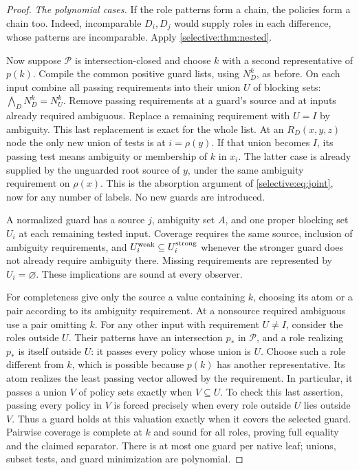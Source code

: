 \begin{proof}
\emph{The polynomial cases.}
If the role patterns form a chain, the policies form a chain too.
Indeed, incomparable $D_i,D_j$ would supply roles in each difference,
whose patterns are incomparable. Apply \cref{selective:thm:nested}.

Now suppose $\mathcal P$ is intersection-closed and choose $k$ with a
second representative of $p(k)$. Compile the common positive guard
lists, using $N_D^k$, as before. On each input combine all passing
requirements into their union $U$ of blocking sets:
$\bigwedge_D N_D^k=N_U^k$. Remove passing requirements at a guard's
source and at inputs already required ambiguous. Replace a remaining
requirement with $U=I$ by ambiguity. This last replacement is exact
for the whole list. At an $R_D(x,y,z)$ node the only new union of
tests is at $i=\rho(y)$. If that union becomes $I$, its passing test
means ambiguity or membership of $k$ in $x_i$. The latter case is
already supplied by the unguarded root source of $y$, under the same
ambiguity requirement on $\rho(x)$. This is the absorption argument
of \eqref{selective:eq:joint}, now for any number of labels. No new
guards are introduced.

A normalized guard has a source $j$, ambiguity set $A$, and one
proper blocking set $U_i$ at each remaining tested input. Coverage
requires the same source, inclusion of ambiguity requirements, and
$U_i^{\rm weak}\subseteq U_i^{\rm strong}$ whenever the stronger
guard does not already require ambiguity there. Missing requirements
are represented by $U_i=\varnothing$. These implications are sound
at every observer.

For completeness give only the source a value containing $k$, choosing
its atom or a pair according to its ambiguity requirement. At a
nonsource required ambiguous use a pair omitting $k$. For any other
input with requirement $U\ne I$, consider the roles outside $U$.
Their patterns have an intersection $p_*$ in $\mathcal P$, and a role
realizing $p_*$ is itself outside $U$: it passes every policy whose
union is $U$. Choose such a role different from $k$, which is possible
because $p(k)$ has another representative. Its atom realizes the
least passing vector allowed by the requirement. In particular, it
passes a union $V$ of policy sets exactly when $V\subseteq U$.
To check this last assertion, passing every policy in $V$ is forced
precisely when every role outside $U$ lies outside $V$.
Thus a guard holds at this valuation exactly when it covers the
selected guard. Pairwise coverage is complete at $k$ and sound for
all roles, proving full equality and the claimed separator.
There is at most one guard per native leaf; unions, subset tests,
and guard minimization are polynomial.


\end{proof}
